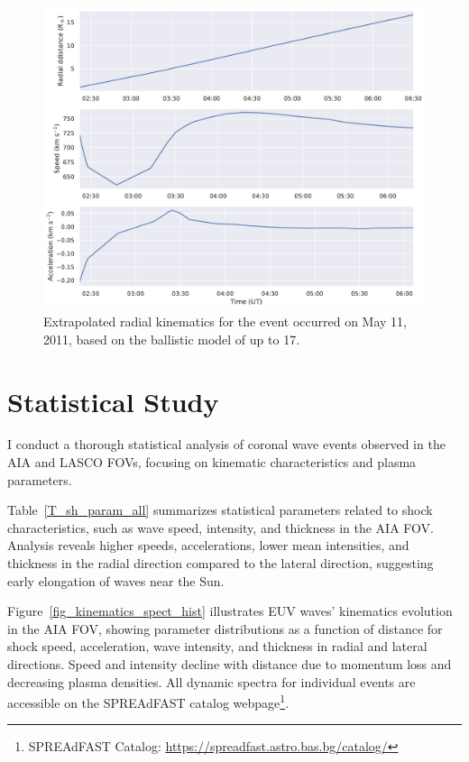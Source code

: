 \begin{figure}[!htp] %
	\centerline{\includegraphics[width=0.8\columnwidth]{chapter2/figs/radial_kinematics_aia_lasco_110511_01.pdf}}
	\caption{Extrapolated radial kinematics for the event occurred on May 11, 2011, based on the ballistic model of \cite{gallagher_2003} up to 17\rsun.}
	\label{fig_rad_kinematics_aialasco_110511}
\end{figure}



\section{Statistical Study}
I conduct a thorough statistical analysis of coronal wave events observed in the AIA and LASCO FOVs, focusing on kinematic characteristics and plasma parameters.

Table~\ref{T_sh_param_all} summarizes statistical parameters related to shock characteristics, such as wave speed, intensity, and thickness in the AIA FOV.
Analysis reveals higher speeds, accelerations, lower mean intensities, and thickness in the radial direction compared to the lateral direction, suggesting early elongation of waves near the Sun.

Figure~\ref{fig_kinematics_spect_hist} illustrates EUV waves' kinematics evolution in the AIA FOV, showing parameter distributions as a function of distance for shock speed, acceleration, wave intensity, and thickness in radial and lateral directions.
Speed and intensity decline with distance due to momentum loss and decreasing plasma densities. All dynamic spectra for individual events are accessible on the SPREAdFAST catalog webpage\footnote{SPREAdFAST Catalog: \url{https://spreadfast.astro.bas.bg/catalog/}}.

